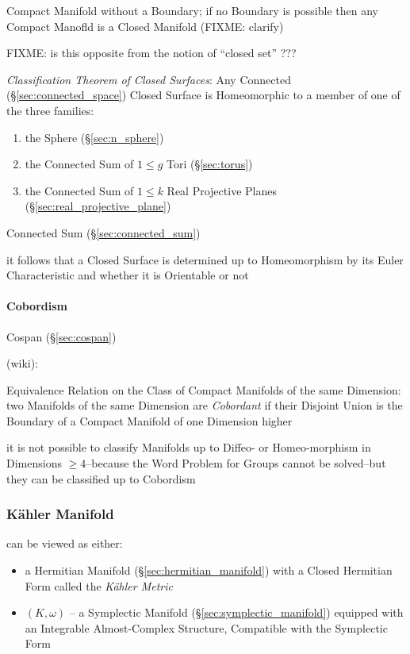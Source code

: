 Compact Manifold without a Boundary; if no Boundary is possible then any
Compact Manofld is a Closed Manifold (FIXME: clarify)

FIXME: is this opposite from the notion of ``closed set'' ???

\emph{Classification Theorem of Closed Surfaces}: Any Connected
(\S\ref{sec:connected_space}) Closed Surface is Homeomorphic to a member of one
of the three families:
\begin{enumerate}
  \item the Sphere (\S\ref{sec:n_sphere})
  \item the Connected Sum of $1 \leq g$ Tori (\S\ref{sec:torus})
  \item the Connected Sum of $1 \leq k$ Real Projective Planes
    (\S\ref{sec:real_projective_plane})
\end{enumerate}
\fist Connected Sum (\S\ref{sec:connected_sum})

it follows that a Closed Surface is determined up to Homeomorphism by its Euler
Characteristic and whether it is Orientable or not



\paragraph{Cobordism}\label{sec:cobordism}\hfill

Cospan (\S\ref{sec:cospan})

(wiki):

Equivalence Relation on the Class of Compact Manifolds of the same Dimension:
two Manifolds of the same Dimension are \emph{Cobordant} if their Disjoint
Union is the Boundary of a Compact Manifold of one Dimension higher

it is not possible to classify Manifolds up to Diffeo- or Homeo-morphism in
Dimensions $\geq 4$--because the Word Problem for Groups cannot be solved--but
they can be classified up to Cobordism




\subsubsection{K\"ahler Manifold}\label{sec:kahler_manifold}

can be viewed as either:

\begin{itemize}
\item a Hermitian Manifold (\S\ref{sec:hermitian_manifold}) with a
  Closed Hermitian Form called the \emph{K\"ahler Metric} %
\item $(K,\omega)$ -- a Symplectic Manifold
  (\S\ref{sec:symplectic_manifold}) equipped with an Integrable
  Almost-Complex Structure, Compatible with the Symplectic Form %
\end{itemize}



